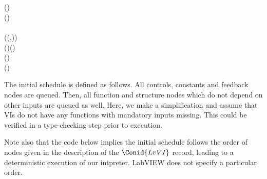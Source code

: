 \begin{hscode}
\\[\blanklineskip]%
\>[4]{}\<[7]%
\>[7]{}\mathbin{::}\to {}\<[E]%
\\
\>[4]{}\<[7]%
\>[7]{}\;(\;){}\<[53]%
\>[53]{}\mathrel{=}\<[E]%
\\
\>[4]{}\<[7]%
\>[7]{}\;(\;){}\<[53]%
\>[53]{}\mathrel{=}\<[E]%
\\
\>[4]{}\<[7]%
\>[7]{}\;\anonymous {}\<[53]%
\>[53]{}\mathrel{=}\;\<[E]%
\\[\blanklineskip]%
\>[4]{}\<[7]%
\>[7]{}\mathbin{::}((,)\to {})\<[E]%
\\
\>[4]{}\<[7]%
\>[7]{}\;\;\mathrel{=}\;(\;)\;(\;)\;\<[E]%
\\[\blanklineskip]%
\>[B]{}\mathbin{::}\to {}\;(\;){}\<[E]%
\\
\>[B]{}\;\mathrel{=}\;(\;\;){}\<[E]%
\ColumnHook
\end{hscode}\resethooks

The initial schedule is defined as follows. All controls, constants and
feedback nodes are queued. Then, all function and structure nodes which do not
depend on other inputs are queued as well. Here, we make a simplification and
assume that VIs do not have any functions with mandatory inputs missing. This
could be verified in a type-checking step prior to execution.

Note also that the code below implies the initial schedule follows the order
of nodes given in the description of the \ensuremath{\Conid{LvVI}} record, leading to a
deterministic execution of our intpreter. LabVIEW does not specify a
particular order.

